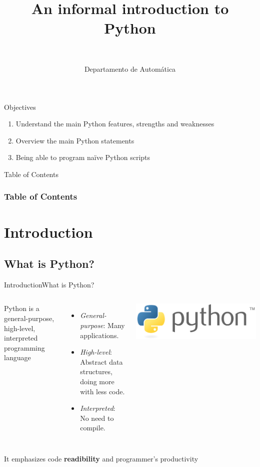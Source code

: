 \documentclass[10pt,compress]{beamer} %
\title[An informal introduction to Python]{An informal introduction to Python}
\author{\asignatura\\\carrera}
\institute{}
\date{Departamento de Automática}
\begin{document}
{\titlepageBlue
    \begin{frame}
        \titlepage
    \end{frame}
}

\institute{\asignatura}

\begin{frame}[plain]{}
	\begin{block}{Objectives}
		\begin{enumerate}
		\item Understand the main Python features, strengths and weaknesses
		\item Overview the main Python statements
		\item Being able to program na\"ive Python scripts
		\end{enumerate}
	\end{block}
\end{frame}

{
\begin{frame}[shrink]{Table of Contents}
 \frametitle{Table of Contents}
 \tableofcontents
\end{frame}
}

\section{Introduction}
\subsection{What is Python?}

\begin{frame}{Introduction}{What is Python?}
    \begin{columns}
			Python is a general-purpose, high-level, interpreted programming language
				\begin{itemize}
				\item \textit{General-purpose}: Many applications.
				\item \textit{High-level}: Abstract data structures, doing more with less code.
				\item \textit{Interpreted}: No need to compile.
				\end{itemize}

		\centering \hspace{-2cm} \includegraphics[width=1.8\linewidth]{figs/python.png}
	\end{columns}
	\bigskip
			It emphasizes code \textbf{readibility} and programmer's productivity\\
\end{frame}
\end{document}
